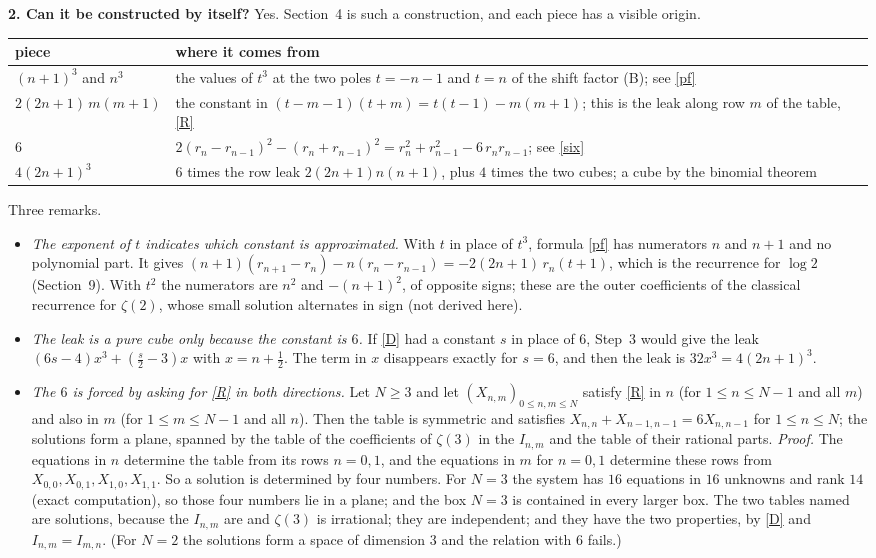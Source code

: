 \documentclass[11pt]{article}
\newcommand{\q}[1]{\medskip\noindent\textbf{#1}}
\begin{document}
\q{2. Can it be constructed by itself?} Yes. Section~4 is such a construction, and each piece has a
visible origin.
\begin{center}
\begin{tabular}{@{}lp{}@{}}
\toprule
piece & where it comes from\\
\midrule
$(n+1)^3$ and $n^3$ & the values of $t^3$ at the two poles $t=-n-1$ and $t=n$ of the shift
factor (B); see \eqref{pf}\\[2pt]
$2(2n+1)\,m(m+1)$ & the constant in $(t-m-1)(t+m)=t(t-1)-m(m+1)$; this is the leak along row $m$
of the table, \eqref{R}\\[2pt]
$6$ & $2(r_n-r_{n-1})^2-(r_n+r_{n-1})^2=r_n^2+r_{n-1}^2-6\,r_nr_{n-1}$; see \eqref{six}\\[2pt]
$4(2n+1)^3$ & $6$ times the row leak $2(2n+1)n(n+1)$, plus $4$ times the two cubes; a cube by
the binomial theorem\\
\bottomrule
\end{tabular}
\end{center}
Three remarks.
\begin{itemize}
\item \emph{The exponent of $t$ indicates which constant is approximated.} With $t$ in place of $t^3$, formula
\eqref{pf} has numerators $n$ and $n+1$ and no polynomial part. It gives
$(n+1)(r_{n+1}-r_n)-n(r_n-r_{n-1})=-2(2n+1)\,r_n(t+1)$, which is the recurrence for $\log2$
(Section~9). With $t^2$ the numerators are $n^2$ and $-(n+1)^2$, of opposite signs; these are the
outer coefficients of the classical recurrence for $\zeta(2)$, whose small solution alternates in
sign (not derived here).
\item \emph{The leak is a pure cube only because the constant is $6$.} If \eqref{D} had a constant
$s$ in place of $6$, Step~3 would give the leak $(6s-4)x^3+(\frac s2-3)x$ with $x=n+\frac12$. The
term in $x$ disappears exactly for $s=6$, and then the leak is $32x^3=4(2n+1)^3$.
\item \emph{The $6$ is forced by asking for \eqref{R} in both directions.} Let $N\ge3$ and let
$(X_{n,m})_{0\le n,m\le N}$ satisfy \eqref{R} in $n$ (for $1\le n\le N-1$ and all $m$) and also in
$m$ (for $1\le m\le N-1$ and all $n$). Then the table is symmetric and satisfies
$X_{n,n}+X_{n-1,n-1}=6X_{n,n-1}$ for $1\le n\le N$; the solutions form a plane, spanned by the table
of the coefficients of $\zeta(3)$ in the $I_{n,m}$ and the table of their rational parts.
\emph{Proof.} The equations in $n$ determine the table from its rows $n=0,1$, and the equations in
$m$ for $n=0,1$ determine these rows from $X_{0,0},X_{0,1},X_{1,0},X_{1,1}$. So a solution is
determined by four numbers. For $N=3$ the system has $16$ equations in $16$ unknowns and rank $14$
(exact computation), so those four numbers lie in a plane; and the box $N=3$ is contained in every
larger box. The two tables named are solutions, because the $I_{n,m}$ are and $\zeta(3)$ is
irrational; they are independent; and they have the two properties, by \eqref{D} and
$I_{n,m}=I_{m,n}$. (For $N=2$ the solutions form a space of dimension $3$ and the relation with $6$
fails.)
\end{itemize}
\end{document}

